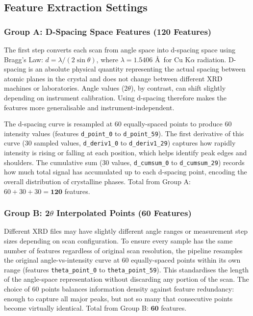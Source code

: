 \documentclass[12pt, oneside]{article} %
\begin{document}
\subsection{Feature Extraction Settings}

\subsubsection{Group A: D-Spacing Space Features (120 Features)}

The first step converts each scan from angle space into d-spacing space using Bragg's Law: $d = \lambda / (2\sin\theta)$, where $\lambda = 1.5406$ \AA\ for Cu K$\alpha$ radiation. D-spacing is an absolute physical quantity representing the actual spacing between atomic planes in the crystal and does not change between different XRD machines or laboratories. Angle values ($2\theta$), by contrast, can shift slightly depending on instrument calibration. Using d-spacing therefore makes the features more generalisable and instrument-independent.

The d-spacing curve is resampled at 60 equally-spaced points to produce 60 intensity values (features \texttt{d\_point\_0} to \texttt{d\_point\_59}). The first derivative of this curve (30 sampled values, \texttt{d\_deriv1\_0} to \texttt{d\_deriv1\_29}) captures how rapidly intensity is rising or falling at each position, which helps identify peak edges and shoulders. The cumulative sum (30 values, \texttt{d\_cumsum\_0} to \texttt{d\_cumsum\_29}) records how much total signal has accumulated up to each d-spacing point, encoding the overall distribution of crystalline phases. Total from Group A: $60 + 30 + 30 = \mathbf{120}$ features.

\subsubsection{Group B: 2$\theta$ Interpolated Points (60 Features)}

Different XRD files may have slightly different angle ranges or measurement step sizes depending on scan configuration. To ensure every sample has the same number of features regardless of original scan resolution, the pipeline resamples the original angle-vs-intensity curve at 60 equally-spaced points within its own range (features \texttt{theta\_point\_0} to \texttt{theta\_point\_59}). This standardises the length of the angle-space representation without discarding any portion of the scan. The choice of 60 points balances information density against feature redundancy: enough to capture all major peaks, but not so many that consecutive points become virtually identical. Total from Group B: $\mathbf{60}$ features.
\end{document}
